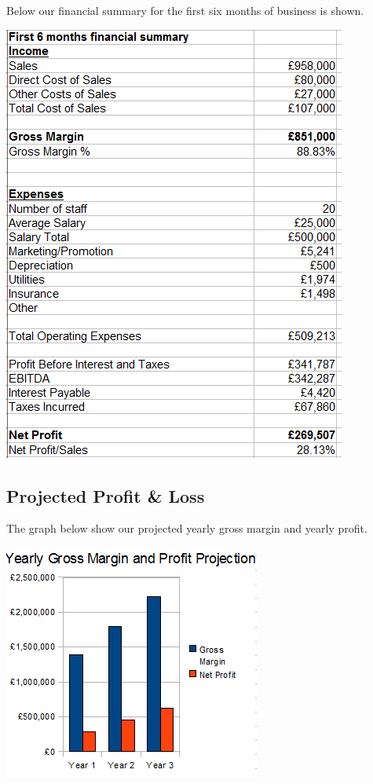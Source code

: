 \documentclass{article}
\begin{document}
Below our financial summary for the first six months of business is shown. \\

\begin{center}
\includegraphics[scale=0.8]{firstSixMonths.png}
\end{center}

\subsection{Projected Profit \& Loss}

The graph below show our projected yearly gross margin and yearly profit. \\
\begin{center}
\includegraphics[scale=0.9]{grossMarginAndProfitProjection.png}
\end{center}
\end{document}
